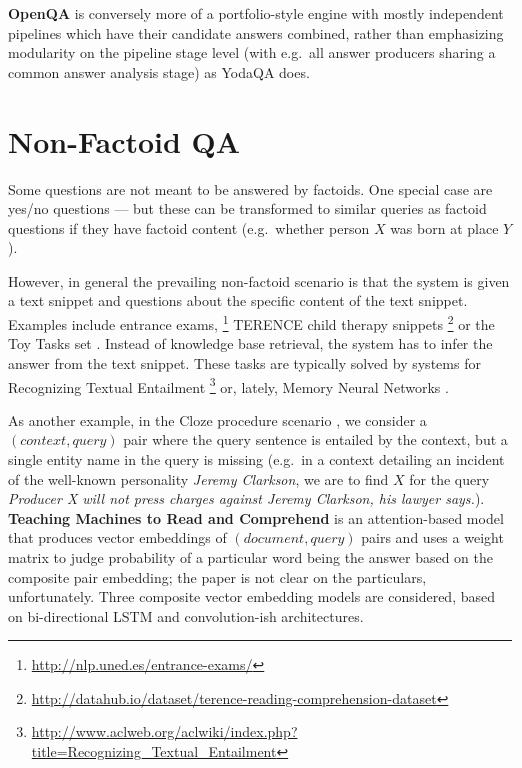 \textbf{OpenQA} \citep{OpenQA} is conversely more of a portfolio-style engine with
mostly independent pipelines which have their candidate answers combined,
rather than emphasizing modularity on the pipeline stage level
(with e.g.\ all answer producers sharing a common answer analysis stage)
as YodaQA does.





\section{Non-Factoid QA}
\label{sec:nonfactoid}

Some questions are not meant to be answered by factoids.
One special case are yes/no questions --- but these can be
transformed to similar queries as factoid questions if they have
factoid content (e.g.\ whether person $X$ was born at place $Y$).

However, in general the prevailing non-factoid scenario is that
the system is given a text snippet and questions about the specific
content of the text snippet.  Examples include entrance exams,%
\footnote{\url{http://nlp.uned.es/entrance-exams/}}
TERENCE child therapy snippets%
\footnote{\url{http://datahub.io/dataset/terence-reading-comprehension-dataset}}
or the Toy Tasks set \citep{ToyTasks}.%
Instead of knowledge base retrieval, the system has to infer
the answer from the text snippet.
These tasks are typically solved by systems for Recognizing Textual Entailment%
\footnote{\url{http://www.aclweb.org/aclwiki/index.php?title=Recognizing_Textual_Entailment}}
or, lately, Memory Neural Networks \citep{MemNN}.

As another example,
in the Cloze procedure scenario \citep{Cloze},
we consider a $(context, query)$ pair where the query
sentence is entailed by the context, but a single entity name in the query
is missing (e.g.\ in a context detailing an incident of the well-known personality
\textit{Jeremy Clarkson}, we are to find $X$ for the query
\textit{Producer X will not press charges against Jeremy Clarkson, his lawyer says.}).
\textbf{Teaching Machines to Read and Comprehend} \citep{ReadAndComprehend}
	is an attention-based model that produces vector embeddings of $(document, query)$
	pairs and uses a weight matrix to judge probability of a particular
	word being the answer based on the composite pair embedding;
	the paper is not clear on the particulars, unfortunately.
	Three composite vector embedding models are considered,
	based on bi-directional LSTM and convolution-ish architectures.





